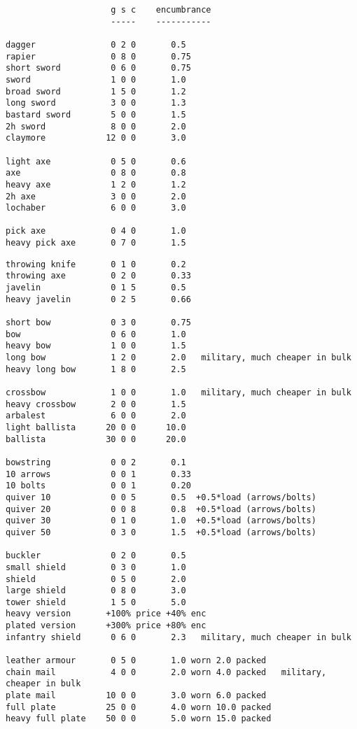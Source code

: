 \small \begin{verbatim}
                     g s c    encumbrance
                     -----    -----------

dagger               0 2 0       0.5
rapier               0 8 0       0.75
short sword          0 6 0       0.75
sword                1 0 0       1.0
broad sword          1 5 0       1.2
long sword           3 0 0       1.3
bastard sword        5 0 0       1.5
2h sword             8 0 0       2.0
claymore            12 0 0       3.0

light axe            0 5 0       0.6
axe                  0 8 0       0.8
heavy axe            1 2 0       1.2
2h axe               3 0 0       2.0
lochaber             6 0 0       3.0

pick axe             0 4 0       1.0
heavy pick axe       0 7 0       1.5

\end{verbatim} \pagebreak[1] \begin{verbatim}
throwing knife       0 1 0       0.2
throwing axe         0 2 0       0.33
javelin              0 1 5       0.5
heavy javelin        0 2 5       0.66

short bow            0 3 0       0.75
bow                  0 6 0       1.0
heavy bow            1 0 0       1.5
long bow             1 2 0       2.0   military, much cheaper in bulk
heavy long bow       1 8 0       2.5

crossbow             1 0 0       1.0   military, much cheaper in bulk
heavy crossbow       2 0 0       1.5
arbalest             6 0 0       2.0
light ballista      20 0 0      10.0
ballista            30 0 0      20.0

bowstring            0 0 2       0.1
10 arrows            0 0 1       0.33
10 bolts             0 0 1       0.20
quiver 10            0 0 5       0.5  +0.5*load (arrows/bolts)
quiver 20            0 0 8       0.8  +0.5*load (arrows/bolts)
quiver 30            0 1 0       1.0  +0.5*load (arrows/bolts)
quiver 50            0 3 0       1.5  +0.5*load (arrows/bolts)

buckler              0 2 0       0.5
small shield         0 3 0       1.0
shield               0 5 0       2.0
large shield         0 8 0       3.0
tower shield         1 5 0       5.0
heavy version       +100% price +40% enc
plated version      +300% price +80% enc
infantry shield      0 6 0       2.3   military, much cheaper in bulk

leather armour       0 5 0       1.0 worn 2.0 packed
chain mail           4 0 0       2.0 worn 4.0 packed   military, cheaper in bulk
plate mail          10 0 0       3.0 worn 6.0 packed
full plate          25 0 0       4.0 worn 10.0 packed
heavy full plate    50 0 0       5.0 worn 15.0 packed
\end{verbatim} \normalsize
\pagebreak[1]






